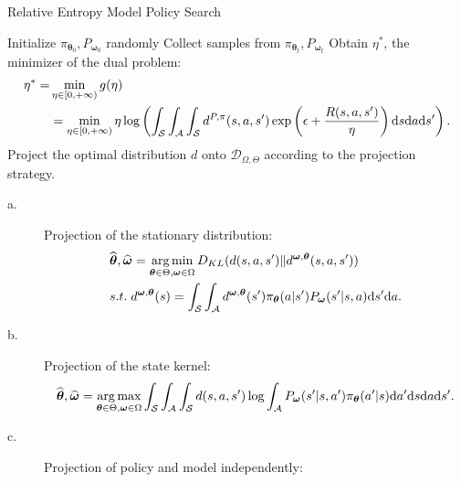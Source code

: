 \begin{algorithm}[tb]
  \caption{Relative Entropy Model Policy Search
    \label{alg:remps}}
  \begin{algorithmic}[1]
  \State Initialize $\pi_{\bm{\theta}_0}, P_{\bm{\omega}_0}$ randomly
  \State Collect samples from $\pi_{\bm{\theta}_t}, P_{\bm{\omega}_t}$
  \State Obtain $\eta^*$, the minimizer of the dual problem: 
 \begin{align}
	\eta^* = &\min_{\eta \in [0,+\infty)} g(\eta) \\
	&= \min_{\eta \in [0,+\infty)} \eta \log \left( \int_\mathcal{S} \int_\mathcal{A} \int_\mathcal{S} d^{P,\pi}(s,a,s') \exp \left(\epsilon + \frac{R(s,a,s')}{\eta} \right)\mathrm{d}s \mathrm{d}a \mathrm{d}s' \right).
\end{align}
  \State Project the optimal distribution $d$ onto $\mathcal{D}_{\Omega, \Theta}$ according to the projection strategy. %
\begin{description}
  	\item[a.]   Projection of the stationary distribution: \begin{align*}
	& \widehat{\bm{\mathbf{\theta}}}, \widehat{\bm{\mathbf{\omega}}} = \operatorname*{arg\,min}_{\bm{\mathbf{\theta}} \in \Theta, \bm{\mathbf{\omega}} \in \Omega} D_{KL} (d(s,a,s') \| d^{\bm{\mathbf{\omega}}, \bm{\mathbf{\theta}}}(s,a,s'))  \\
    & s.t. \; d^{\bm{\mathbf{\omega}}, \bm{\mathbf{\theta}}}(s) =\int_{\mathcal{S}} \int_{\mathcal{A}}d^{\bm{\mathbf{\omega}}, \bm{\mathbf{\theta}}}(s') \pi_{\bm{\mathbf{\theta}}}(a|s') P_{\bm{\mathbf{\omega}}}(s'|s,a) \mathrm{d}s' \mathrm{d}a.
\end{align*}
  	\item[b.]  Projection of the state kernel: $$
  \widehat{\bm{\mathbf{\theta}}}, \widehat{\bm{\mathbf{\omega}}} = \operatorname*{arg\,max}_{\bm{\mathbf{\theta}} \in \Theta, \bm{\mathbf{\omega}} \in \Omega} \int_{\mathcal{S}}\int_{\mathcal{A}}\int_{\mathcal{S}} d(s,a,s') \log \int_{\mathcal{A}} P_{\bm{\mathbf{\omega}}}(s'|s,a') \pi_{\bm{\mathbf{\theta}}}(a'|s) \mathrm{d}a' \mathrm{d}s \mathrm{d}a \mathrm{d}s' .
  $$
  \item[c.] Projection of policy and model independently: 
\begin{align}

\end{align}
\end{description}
\end{algorithmic}
\end{algorithm}
